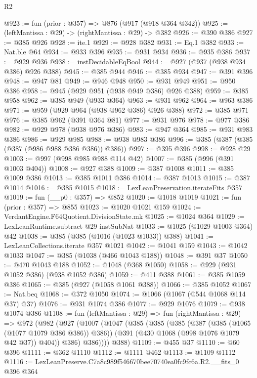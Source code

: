 \begin{lexlean}{R2}
\begin{coremodule}
@923 := fun (prior : @357) => @876 (@917 (@918 @364 @342))
@925 := (leftMantissa : @29) -> (rightMantissa : @29) -> @382
@926 := @390 @386
@927 := @385 @926
@928 := ite.{1}
@929 := @928 @382
@931 := Eq.{1} @382
@933 := Nat.ble @64
@934 := @933 @396
@935 := @931 @934
@936 := @935 @386
@937 := @929 @936
@938 := instDecidableEqBool
@944 := @927 (@937 (@938 @934 @386) @926 @388)
@945 := @385 @944
@946 := @385 @934
@947 := @391 @396
@948 := @947 @81
@949 := @946 @948
@950 := @931 @949
@951 := @950 @386
@958 := @945 (@929 @951 (@938 @949 @386) @926 @388)
@959 := @385 @958
@962 := @385 @949 (@933 @364)
@963 := @931 @962
@964 := @963 @386
@971 := @959 (@929 @964 (@938 @962 @386) @926 @388)
@972 := @385 @971
@976 := @385 @962 (@391 @364 @81)
@977 := @931 @976
@978 := @977 @386
@982 := @929 @978 (@938 @976 @386)
@983 := @947 @364
@985 := @931 @983 @386
@986 := @929 @985
@988 := @938 @983 @386
@996 := @385 (@387 (@385 (@387 (@986 @988 @386 @386)) @386))
@997 := @395 @396
@998 := @928 @29
@1003 := @997 (@998 @985 @988 @114 @42)
@1007 := @385 (@996 (@391 @1003 @404))
@1008 := @927 @388
@1009 := @387 @1008
@1011 := @385 @1009 @386
@1013 := @385 @1011 @386
@1014 := @387 @1013
@1015 := @387 @1014
@1016 := @385 @1015
@1018 := LexLeanPreservation.iterateFits @357
@1019 := fun (__p0 : @357) => @852
@1020 := @1018 @1019
@1021 := fun (prior : @357) => @855
@1023 := @1020 @1021 @159
@1024 := VerdantEngine.F64Quotient.DivisionState.mk
@1025 := @1024 @364
@1029 := LexLeanRuntime.subtract @29 instSubNat
@1033 := @1025 (@1029 @1003 @364) @42
@1038 := @385 (@385 (@1016 (@1023 @1033)) @388)
@1041 := LexLeanCollections.iterate @357 @1021
@1042 := @1041 @159
@1043 := @1042 @1033
@1047 := @385 (@1038 (@466 @1043 @188))
@1048 := @391 @37
@1050 := @470 @1043 @188
@1052 := @1048 (@368 @1050)
@1058 := @929 (@931 @1052 @386) (@938 @1052 @386)
@1059 := @411 @388
@1061 := @385 @1059 @386
@1065 := @385 (@927 (@1058 @1061 @388))
@1066 := @385 @1052
@1067 := Nat.beq
@1068 := @372 @1050
@1074 := @1066 (@1067 (@544 @1068 @114 @37) @37)
@1076 := @931 @1074 @386
@1077 := @929 @1076
@1079 := @938 @1074 @386
@1108 := fun (leftMantissa : @29) =>
  fun (rightMantissa : @29) =>
  @972
    (@982
      (@927
        (@1007
          (@1047
            (@385
              (@385
                (@385
                  (@387 (@385 (@1065 (@1077 @1079 @386 @386)) @386))
                  (@391 (@430 @1068 (@998 @1076 @1079 @42 @37)) @404))
                @386)
              @386))))
      @388)
@1109 := @455 @37
@1110 := @60 @396
@1111 := @362 @1110
@1112 := @1111 @462
@1113 := @1109 @1112
@1116 := LexLeanPreserve.C7a8c989f546670bee70740ea0fc9fc6a.R2.__fits_0 @396 @364

\end{coremodule}
\end{lexlean}
